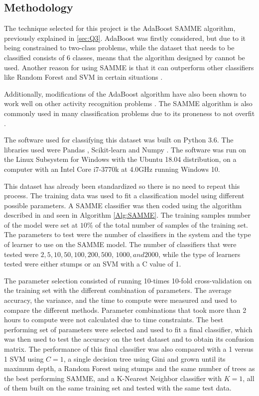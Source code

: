 \documentclass{article}
\begin{document}
\subsection{Methodology}
The technique selected for this project is the AdaBoost SAMME algorithm, previously explained in \ref{sec:Q3}. AdaBoost was firstly considered, but due to it being constrained to two-class problems, while the dataset that needs to be classified consists of 6 classes, means that the algorithm designed by \cite{Freund_adaboost} cannot be used. Another reason for using SAMME is that it can outperform other classifiers like Random Forest and SVM in certain situations \cite{multi_class_adaboost, random_forests_vs_SAMME, random_forests_vs_SVM, SAMME_inbalancedData}. 

Additionally, modifications of the AdaBoost algorithm have also been shown to work well on other activity recognition problems \cite{Reiss_ConfAdaboost}. The SAMME algorithm is also commonly used in many classification problems due to its proneness to not overfit \cite{adaboost_forward_stagewise_additive}.

The software used for classifying this dataset was built on Python 3.6. The libraries used were Pandas \cite{library_pandas}, Scikit-learn \cite{library_scikit-learn} and Numpy \cite{library_numpy}.
The software was run on the Linux Subsystem for Windows with the Ubuntu 18.04 distribution, on a computer with an Intel Core i7-3770k at 4.0GHz running Windows 10.

This dataset has already been standardized so there is no need to repeat this process. The training data was used to fit a classification model using different possible parameters. A SAMME classifier was then coded using the algorithm described in \cite{multi_class_adaboost} and seen in Algorithm \ref{Alg:SAMME}. The training samples number of the model were set at $10\%$ of the total number of samples of the training set. The parameters to test were the number of classifiers in the system and the type of learner to use on the SAMME model. The number of classifiers that were tested were $2, 5, 10, 50, 100, 200, 500$, $1000, and 2000$, while the type of learners tested were either stumps or an SVM with a C value of 1. 

The parameter selection consisted of running 10-times 10-fold cross-validation on the training set with the different combination of parameters. The average accuracy, the variance, and the time to compute were measured and used to compare the different methods. Parameter combinations that took more than 2 hours to compute were not calculated due to time constraints. The best performing set of parameters were selected and used to fit a final classifier, which was then used to test the accuracy on the test dataset and to obtain its confusion matrix. The performance of this final classifier was also compared with a 1 versus 1 SVM using $C=1$, a single decision tree using Gini and grown until its maximum depth, a Random Forest using stumps and the same number of trees as the best performing SAMME, and a K-Nearest Neighbor classifier with $K=1$, all of them built on the same training set and tested with the same test data.
\end{document}
